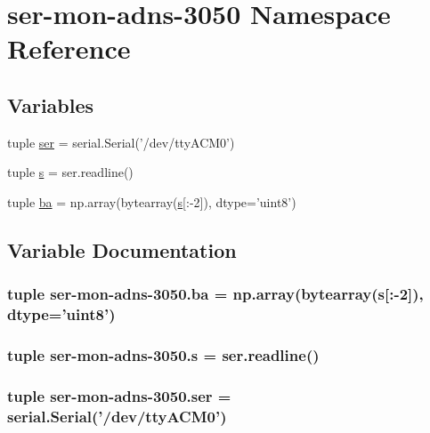 \hypertarget{namespaceser-mon-adns-3050}{\section{ser-\/mon-\/adns-\/3050 Namespace Reference}
\label{namespaceser-mon-adns-3050}
}
\subsection*{Variables}
\begin{DoxyCompactItemize}
\item 
tuple \hyperlink{namespaceser-mon-adns-3050_aeb75b8d2274f52835b8a3c670650abc1}{ser} = serial.\-Serial('/dev/tty\-A\-C\-M0')
\item 
tuple \hyperlink{namespaceser-mon-adns-3050_a292f31fb2fd0e796b495e18bddd6371c}{s} = ser.\-readline()
\item 
tuple \hyperlink{namespaceser-mon-adns-3050_a0e229bbf6215af5bfc987333a7c5d3ab}{ba} = np.\-array(bytearray(\hyperlink{namespaceser-mon-adns-3050_a292f31fb2fd0e796b495e18bddd6371c}{s}\mbox{[}\-:-\/2\mbox{]}), dtype='uint8')
\end{DoxyCompactItemize}


\subsection{Variable Documentation}
\hypertarget{namespaceser-mon-adns-3050_a0e229bbf6215af5bfc987333a7c5d3ab}{
\subsubsection[{ba}]{\setlength{\rightskip}{0pt plus 5cm}tuple {\bf ser}-\/mon-\/adns-\/3050.ba = np.\-array(bytearray({\bf s}\mbox{[}\-:-\/2\mbox{]}), dtype='uint8')}}\label{namespaceser-mon-adns-3050_a0e229bbf6215af5bfc987333a7c5d3ab}
\hypertarget{namespaceser-mon-adns-3050_a292f31fb2fd0e796b495e18bddd6371c}{
\subsubsection[{s}]{\setlength{\rightskip}{0pt plus 5cm}tuple {\bf ser}-\/mon-\/adns-\/3050.s = ser.\-readline()}}\label{namespaceser-mon-adns-3050_a292f31fb2fd0e796b495e18bddd6371c}
\hypertarget{namespaceser-mon-adns-3050_aeb75b8d2274f52835b8a3c670650abc1}{
\subsubsection[{ser}]{\setlength{\rightskip}{0pt plus 5cm}tuple ser-\/mon-\/adns-\/3050.ser = serial.\-Serial('/dev/tty\-A\-C\-M0')}}\label{namespaceser-mon-adns-3050_aeb75b8d2274f52835b8a3c670650abc1}
